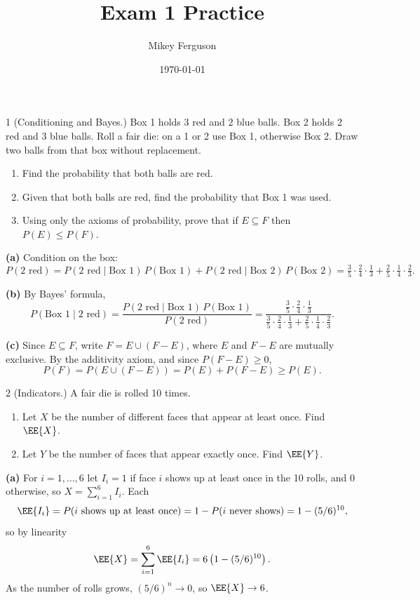 \documentclass[11pt]{article}
\title{Exam 1 Practice}
\author{Mikey Ferguson}
\date{\today}
\begin{document}
\maketitle


\begin{problem}{1}
  (Conditioning and Bayes.) Box 1 holds 3 red and 2 blue balls. Box 2 holds 2 red and
  3 blue balls. Roll a fair die: on a 1 or 2 use Box 1, otherwise Box 2. Draw two balls
  from that box without replacement.
  \begin{enumerate}
    \item[(a)] Find the probability that both balls are red.
    \item[(b)] Given that both balls are red, find the probability that Box 1 was used.
    \item[(c)] Using only the axioms of probability, prove that if $E \subseteq F$ then
      $P(E) \le P(F)$.
  \end{enumerate}
\end{problem}
\textbf{(a)} Condition on the box:
\[
  P(2 \text{ red}) = P(2 \text{ red} \mid \text{Box 1})\,P(\text{Box 1})
    + P(2 \text{ red} \mid \text{Box 2})\,P(\text{Box 2})
  = \tfrac35 \cdot \tfrac24 \cdot \tfrac13 + \tfrac25 \cdot \tfrac14 \cdot \tfrac23.
\]

\textbf{(b)} By Bayes' formula,
\[
  P(\text{Box 1} \mid 2 \text{ red})
    = \frac{P(2 \text{ red} \mid \text{Box 1})\,P(\text{Box 1})}{P(2 \text{ red})}
    = \frac{\tfrac35 \cdot \tfrac24 \cdot \tfrac13}
           {\tfrac35 \cdot \tfrac24 \cdot \tfrac13 + \tfrac25 \cdot \tfrac14 \cdot \tfrac23}.
\]

\textbf{(c)} Since $E \subseteq F$, write $F = E \cup (F - E)$, where $E$ and $F - E$ are
mutually exclusive. By the additivity axiom, and since $P(F - E) \ge 0$,
\[
  P(F) = P(E \cup (F - E)) = P(E) + P(F - E) \ge P(E).
\]

\begin{problem}{2}
  (Indicators.) A fair die is rolled 10 times.
  \begin{enumerate}
    \item[(a)] Let $X$ be the number of different faces that appear at least once.
      Find $\EE{X}$.
    \item[(b)] Let $Y$ be the number of faces that appear exactly once. Find $\EE{Y}$.
  \end{enumerate}
\end{problem}
\textbf{(a)} For $i = 1, \ldots, 6$ let $I_i = 1$ if face $i$ shows up at least once
in the 10 rolls, and $0$ otherwise, so $X = \sum_{i=1}^{6} I_i$. Each
\[
  \EE{I_i} = P(i \text{ shows up at least once}) = 1 - P(i \text{ never shows})
    = 1 - (5/6)^{10},
\]
so by linearity
\[
  \EE{X} = \sum_{i=1}^{6} \EE{I_i} = 6\left(1 - (5/6)^{10}\right).
\]
As the number of rolls grows, $(5/6)^n \to 0$, so $\EE{X} \to 6$.
\end{document}
